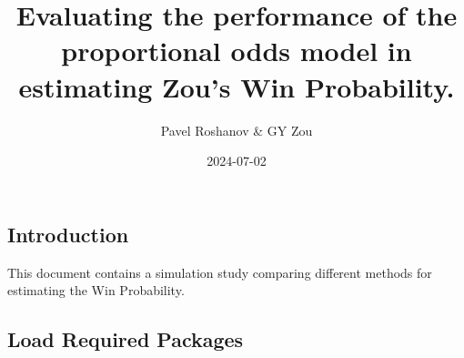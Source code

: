 \documentclass[
  letterpaper,
  DIV=11,
  numbers=noendperiod]{scrartcl}
\title{Evaluating the performance of the proportional odds model in
estimating Zou's Win Probability.}
\author{Pavel Roshanov \& GY Zou}
\date{2024-07-02}
\renewcommand*\contentsname{Table of contents}
\newcommand\contentsname{Table of contents}
\begin{document}
\maketitle

\renewcommand*\contentsname{Table of contents}
{
\hypersetup{linkcolor=}
\setcounter{tocdepth}{3}
\tableofcontents
}
\subsection{Introduction}\label{introduction}

This document contains a simulation study comparing different methods
for estimating the Win Probability.

\subsection{Load Required Packages}\label{load-required-packages}
\end{document}
